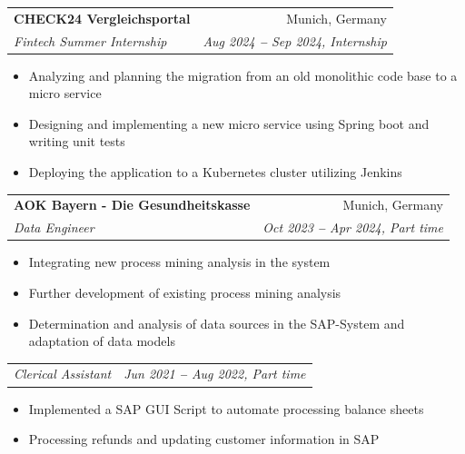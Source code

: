 \documentclass[letterpaper,11pt]{article}
\makeatletter
\newcommand{\resumeItem}[1]{
  \item\small{
    {#1 \vspace{-2pt}}
  }
}
\newcommand{\resumeSubheading}[4]{
  \vspace{-2pt}\item
    \begin{tabular*}{0.97\textwidth}[t]{l@{\extracolsep{\fill}}r}
      \textbf{#1} & #2 \\
      \textit{\small#3} & \textit{\small #4} \\
    \end{tabular*}\vspace{-7pt}
}
\newcommand{\resumeSubSubheading}[2]{
    \vspace{-2pt}\item
    \begin{tabular*}{0.97\textwidth}{l@{\extracolsep{\fill}}r}
      \textit{\small#1} & \textit{\small #2} \\
    \end{tabular*}\vspace{-7pt}
}
\newcommand{\resumeItemListStart}{\begin{itemize}}
\newcommand{\resumeItemListEnd}{\end{itemize}\vspace{-5pt}}
\makeatother
\begin{document}
    \resumeSubheading
      {CHECK24 Vergleichsportal}{Munich, Germany}
      {Fintech Summer Internship}{Aug 2024 \textbf{--} Sep 2024, Internship}
        \resumeItemListStart
            \resumeItem{Analyzing and planning the migration from an old monolithic code base to a micro service}
            \resumeItem{Designing and implementing a new micro service using Spring boot and writing unit tests}
            \resumeItem{Deploying the application to a Kubernetes cluster utilizing Jenkins}
        \resumeItemListEnd

    \resumeSubheading
      {AOK Bayern - Die Gesundheitskasse}{Munich, Germany}
      {Data Engineer}{Oct 2023 \textbf{--} Apr 2024, Part time}
        \resumeItemListStart
            \resumeItem{Integrating new process mining analysis in the system}
            \resumeItem{Further development of existing process mining analysis}
            \resumeItem{Determination and analysis of data sources in the SAP-System and adaptation of data models}
        \resumeItemListEnd
      \resumeSubSubheading
        {Clerical Assistant}{Jun 2021 \textbf{--} Aug 2022, Part time}
        \resumeItemListStart
            \resumeItem{Implemented a SAP GUI Script to automate processing balance sheets}
            \resumeItem{Processing refunds and updating customer information in SAP}
        \resumeItemListEnd
    
\end{document}
